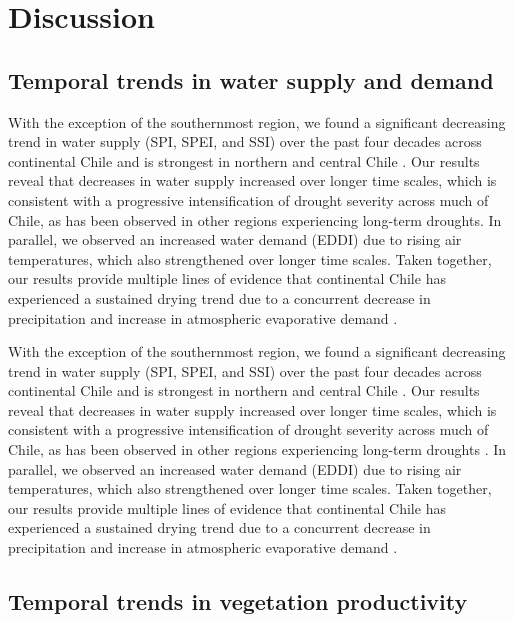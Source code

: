 \documentclass[
  sn-nature,
  numbered]{sn-jnl}
\begin{document}
\section{Discussion}\label{discussion}

\subsection{Temporal trends in water supply and
demand}\label{temporal-trends-in-water-supply-and-demand}

With the exception of the southernmost region, we found a significant
decreasing trend in water supply (SPI, SPEI, and SSI) over the past four
decades across continental Chile and is strongest in northern and
central Chile \citep{Boisier2018, Sarricolea2019}. Our results reveal
that decreases in water supply increased over longer time scales, which
is consistent with a progressive intensification of drought severity
across much of Chile, as has been observed in other regions experiencing
long-term droughts\citep{Rashid2019, Miro2023}. In parallel, we observed
an increased water demand (EDDI) due to rising air temperatures, which
also strengthened over longer time scales. Taken together, our results
provide multiple lines of evidence that continental Chile has
experienced a sustained drying trend due to a concurrent decrease in
precipitation and increase in atmospheric evaporative demand
\citep{Pascoa2021}.

With the exception of the southernmost region, we found a significant
decreasing trend in water supply (SPI, SPEI, and SSI) over the past four
decades across continental Chile and is strongest in northern and
central Chile \citep{Boisier2018, Sarricolea2019}. Our results reveal
that decreases in water supply increased over longer time scales, which
is consistent with a progressive intensification of drought severity
across much of Chile, as has been observed in other regions experiencing
long-term droughts \citep{Rashid2019, Miro2023}. In parallel, we
observed an increased water demand (EDDI) due to rising air
temperatures, which also strengthened over longer time scales. Taken
together, our results provide multiple lines of evidence that
continental Chile has experienced a sustained drying trend due to a
concurrent decrease in precipitation and increase in atmospheric
evaporative demand \citep{Pascoa2021}.

\subsection{Temporal trends in vegetation
productivity}\label{temporal-trends-in-vegetation-productivity}
\end{document}
